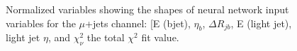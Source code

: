 \begin{figure}[h!]
\vspace{-4.5mm}
\hfil
{}
\caption{Normalized variables showing the shapes of neural network input variables for the $\mu$+jets channel: [E (bjet), $\eta_b$, $\Delta R_{jb}$, E (light jet), light jet $\eta$, and $\chi^2_\nu$ the total $\chi^2$ fit value.  }
\label{fig:VarPlots4}
\end{figure}


